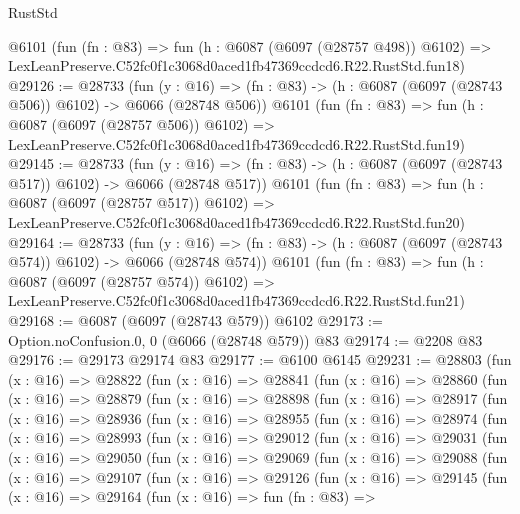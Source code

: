 \begin{lexlean}{RustStd}
\begin{coremodule}
    @6101
    (fun (fn : @83) =>
    fun (h : @6087 (@6097 (@28757 @498)) @6102) =>
    LexLeanPreserve.C52fc0f1c3068d0aced1fb47369ccdcd6.R22.RustStd.fun18)
@29126 := @28733
    (fun (y : @16) => (fn : @83) -> (h : @6087 (@6097 (@28743 @506)) @6102) -> @6066 (@28748 @506))
    @6101
    (fun (fn : @83) =>
    fun (h : @6087 (@6097 (@28757 @506)) @6102) =>
    LexLeanPreserve.C52fc0f1c3068d0aced1fb47369ccdcd6.R22.RustStd.fun19)
@29145 := @28733
    (fun (y : @16) => (fn : @83) -> (h : @6087 (@6097 (@28743 @517)) @6102) -> @6066 (@28748 @517))
    @6101
    (fun (fn : @83) =>
    fun (h : @6087 (@6097 (@28757 @517)) @6102) =>
    LexLeanPreserve.C52fc0f1c3068d0aced1fb47369ccdcd6.R22.RustStd.fun20)
@29164 := @28733
    (fun (y : @16) => (fn : @83) -> (h : @6087 (@6097 (@28743 @574)) @6102) -> @6066 (@28748 @574))
    @6101
    (fun (fn : @83) =>
    fun (h : @6087 (@6097 (@28757 @574)) @6102) =>
    LexLeanPreserve.C52fc0f1c3068d0aced1fb47369ccdcd6.R22.RustStd.fun21)
@29168 := @6087 (@6097 (@28743 @579)) @6102
@29173 := Option.noConfusion.{0, 0} (@6066 (@28748 @579)) @83
@29174 := @2208 @83
@29176 := @29173 @29174 @83
@29177 := @6100 @6145
@29231 := @28803
    (fun (x : @16) =>
    @28822
      (fun (x : @16) =>
      @28841
        (fun (x : @16) =>
        @28860
          (fun (x : @16) =>
          @28879
            (fun (x : @16) =>
            @28898
              (fun (x : @16) =>
              @28917
                (fun (x : @16) =>
                @28936
                  (fun (x : @16) =>
                  @28955
                    (fun (x : @16) =>
                    @28974
                      (fun (x : @16) =>
                      @28993
                        (fun (x : @16) =>
                        @29012
                          (fun (x : @16) =>
                          @29031
                            (fun (x : @16) =>
                            @29050
                              (fun (x : @16) =>
                              @29069
                                (fun (x : @16) =>
                                @29088
                                  (fun (x : @16) =>
                                  @29107
                                    (fun (x : @16) =>
                                    @29126
                                      (fun (x : @16) =>
                                      @29145
                                        (fun (x : @16) =>
                                        @29164
                                          (fun (x : @16) =>
                                          fun (fn : @83) =>

\end{coremodule}
\end{lexlean}
